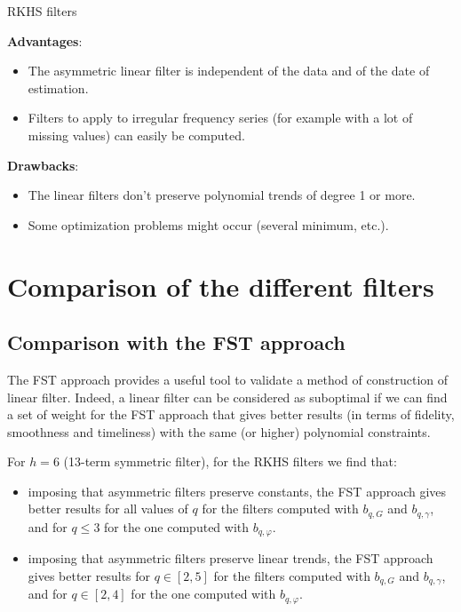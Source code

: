 \documentclass[
  12pt,
  ,
  a4paper]{article}
\newcommand\1{\mathds{1}}
\begin{document}
\begin{summary}{RKHS filters}

\textbf{Advantages}:

\begin{itemize}
\item
  The asymmetric linear filter is independent of the data and of the date of estimation.
\item
  Filters to apply to irregular frequency series (for example with a lot of missing values) can easily be computed.
\end{itemize}

\textbf{Drawbacks}:

\begin{itemize}
\item
  The linear filters don't preserve polynomial trends of degree 1 or more.
\item
  Some optimization problems might occur (several minimum, etc.).
\end{itemize}

\end{summary}

\hypertarget{sec:comparison}{%
\section{Comparison of the different filters}\label{sec:comparison}}

\hypertarget{comparison-with-the-fst-approach}{%
\subsection{Comparison with the FST approach}\label{comparison-with-the-fst-approach}}

The FST approach provides a useful tool to validate a method of construction of linear filter.
Indeed, a linear filter can be considered as suboptimal if we can find a set of weight for the FST approach that gives better results (in terms of fidelity, smoothness and timeliness) with the same (or higher) polynomial constraints.

For \(h=6\) (13-term symmetric filter), for the RKHS filters we find that:

\begin{itemize}
\item
  imposing that asymmetric filters preserve constants, the FST approach gives better results for all values of \(q\) for the filters computed with \(b_{q,G}\) and \(b_{q,\gamma}\), and for \(q\leq 3\) for the one computed with \(b_{q,\varphi}\).
\item
  imposing that asymmetric filters preserve linear trends, the FST approach gives better results for \(q\in[2,5]\) for the filters computed with \(b_{q,G}\) and \(b_{q,\gamma}\), and for \(q\in[2,4]\) for the one computed with \(b_{q,\varphi}\).
\end{itemize}
\end{document}
